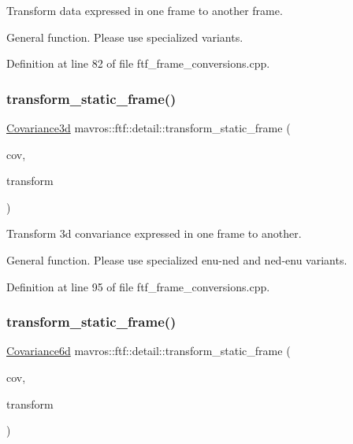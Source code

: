 Transform data expressed in one frame to another frame. 

General function. Please use specialized variants. 

Definition at line 82 of file ftf\+\_\+frame\+\_\+conversions.\+cpp.

\mbox{\label{group__nodelib_ga3a1e55d923c06a8914f7fe570dd42c9b}} 
\subsubsection{\texorpdfstring{transform\_static\_frame()}{transform\_static\_frame()}\hspace{0.1cm}{\footnotesize\ttfamily [2/5]}}
{\footnotesize\ttfamily \mbox{\hyperlink{group__nodelib_ga56776cc8f5410a6bfeafa085fcd6fe30}{Covariance3d}} mavros\+::ftf\+::detail\+::transform\+\_\+static\+\_\+frame (\begin{DoxyParamCaption}\item[{const \mbox{\hyperlink{group__nodelib_ga56776cc8f5410a6bfeafa085fcd6fe30}{Covariance3d}} \&}]{cov,  }\item[{const \mbox{\hyperlink{group__nodelib_gacff0983128574bbbe115917b13e57a63}{Static\+TF}}}]{transform }\end{DoxyParamCaption})}



Transform 3d convariance expressed in one frame to another. 

General function. Please use specialized enu-\/ned and ned-\/enu variants. 

Definition at line 95 of file ftf\+\_\+frame\+\_\+conversions.\+cpp.

\mbox{\label{group__nodelib_gaab4caf957e54695a814cedf5fc45aeb1}} 
\subsubsection{\texorpdfstring{transform\_static\_frame()}{transform\_static\_frame()}\hspace{0.1cm}{\footnotesize\ttfamily [3/5]}}
{\footnotesize\ttfamily \mbox{\hyperlink{group__nodelib_gadc24a922dd3f6a7ff0d7aed9bda42bca}{Covariance6d}} mavros\+::ftf\+::detail\+::transform\+\_\+static\+\_\+frame (\begin{DoxyParamCaption}\item[{const \mbox{\hyperlink{group__nodelib_gadc24a922dd3f6a7ff0d7aed9bda42bca}{Covariance6d}} \&}]{cov,  }\item[{const \mbox{\hyperlink{group__nodelib_gacff0983128574bbbe115917b13e57a63}{Static\+TF}}}]{transform }\end{DoxyParamCaption})}



